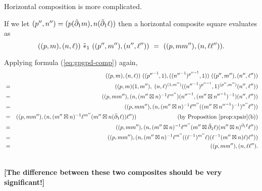 \noindent
Horizontal composition is more complicated.
\begin{lem}
If we let  
$(p^{\prime\prime},n^{\prime\prime}) = (p(\dot{\partial}_1 m),n(\ddot{\partial}_1\ell))$ 
then a horizontal composite square evaluates as 
$$
((p,m),(n,\ell)) ~\ddot{\ast}_1~ ((p^{\prime\prime},m^{\prime\prime}),
                          (n^{\prime\prime},\ell^{\prime\prime}))
~=~
((p,mm^{\prime\prime}),(n,\ell\ell^{\prime\prime})).
$$
\end{lem}
\begin{pf}
Applying formula (\ref{eq:gpgpd-comp}) again,
\begin{eqnarray*}
 & &  ((p,m),(n,\ell))~ 
       (({p^{\prime\prime}}^{-1},1),
        (({n^{\prime\prime}}^{-1})^{{p^{\prime\prime}}^{-1}},1))~ 
           ((p^{\prime\prime},m^{\prime\prime}),
             (n^{\prime\prime},\ell^{\prime\prime})) \\
 &=&  ((p,m)(1,m^{\prime\prime}),\; 
      (n,\ell)^{(1,m^{\prime\prime})}
      (({n^{\prime\prime}}^{-1})^{{p^{\prime\prime}}^{-1}},1)
         ^{(p^{\prime\prime},m^{\prime\prime})}
      (n^{\prime\prime},\ell^{\prime\prime})) \\
 &=&  ((p,mm^{\prime\prime}),
       (n,(m^{\prime\prime} \bt n)^{-1}\ell^{m^{\prime\prime}})
       ({n^{\prime\prime}}^{-1},
         ({m^{\prime\prime}} \bt {n^{\prime\prime}}^{-1})^{-1})  
         (n^{\prime\prime},\ell^{\prime\prime})) \\
 &=&  ((p,mm^{\prime\prime}),
       (n,(m^{\prime\prime} \bt n)^{-1}\ell^{m^{\prime\prime}} 
     (({m^{\prime\prime}} \bt {n^{\prime\prime}}^{-1})^{-1})^{n^{\prime\prime}}
          \ell^{\prime\prime})) \\
 &=&  ((p,mm^{\prime\prime}),
       (n,(m^{\prime\prime} \bt n)^{-1}\ell^{m^{\prime\prime}} 
         (m^{\prime\prime} \bt n(\ddbdyo\ell))\ell^{\prime\prime})) 
      \hspace{25mm}\mbox{(by Proposition \ref{prop:xpair}(b))}     \\
 &=&  ((p,mm^{\prime\prime}),
       (n,(m^{\prime\prime} \bt n)^{-1}\ell^{m^{\prime\prime}} 
         (m^{\prime\prime} \bt \ddbdyo\ell) 
         (m^{\prime\prime} \bt n)^{\ddbdyo\ell}\ell^{\prime\prime})) \\
 &=&  ((p,mm^{\prime\prime}),
       (n,(m^{\prime\prime} \bt n)^{-1}\ell^{m^{\prime\prime}} 
         ((\ell^{-1})^{m^{\prime\prime}}\ell) 
         (\ell^{-1}(m^{\prime\prime} \bt n)\ell)  
          \ell^{\prime\prime})) \\
 &=&  ((p,mm^{\prime\prime}), (n,\ell\ell^{\prime\prime}). 
\end{eqnarray*}
\end{pf}\\
{\bf [The difference between these two composites should be very significant!]}

